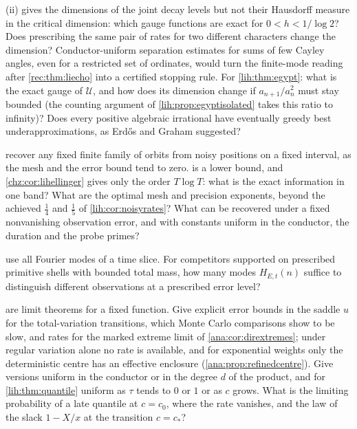 \begin{question}\label{li:q:decay}
(ii) gives the dimensions of the joint decay levels but not their Hausdorff measure in
the critical dimension: which gauge functions are exact for $0<h<1/\log2$? Does prescribing the same pair of
rates for two different characters change the dimension? Conductor-uniform separation estimates for
sums of few Cayley angles, even for a restricted set of ordinates, would turn the finite-mode reading
after \cref{rec:thm:liecho} into a certified stopping rule. For \cref{lih:thm:egypt}: what is the exact gauge
of $\mathcal U$, and how does its dimension change if $a_{n+1}/a_n^2$ must stay bounded (the counting argument
of \cref{lih:prop:egyptisolated} takes this ratio to infinity)? Does every positive algebraic irrational
have eventually greedy best underapproximations, as Erd\H{o}s and Graham suggested?
\end{question}

\begin{question}\label{li:q:paths}
 recover any fixed finite family of orbits from noisy positions
on a fixed interval, as the mesh and the error bound tend to zero.  is a lower
bound, and \cref{chz:cor:lihellinger} gives only the order $T\log T$: what is the exact information in one band? What are the optimal
mesh and precision exponents, beyond the achieved $\frac14$ and $\frac15$ of \cref{lih:cor:noisyrates}? What
can be recovered under a fixed nonvanishing observation error, and with constants uniform in the
conductor, the duration and the probe primes?
\end{question}

\begin{question}\label{li:q:modes}
 use all Fourier modes of a time slice. For competitors supported on
prescribed primitive shells with bounded total mass, how many modes $H_{E,t}(n)$ suffice to distinguish different
observations at a prescribed error level?
\end{question}

\begin{question}\label{ana:q:condlaw}
are limit theorems for a fixed function. Give explicit error bounds in the saddle $u$ for the
total-variation transitions, which Monte Carlo comparisons show to be slow, and rates for the marked
extreme limit of \cref{ana:cor:dirextremes}; under regular variation alone no rate is available, and for
exponential weights only the deterministic centre has an effective enclosure
(\cref{ana:prop:refinedcentre}). Give versions uniform in the conductor or in the degree $d$ of the
product, and for \cref{lih:thm:quantile} uniform as $\tau$ tends to $0$ or $1$ or as $c$ grows. What is the
limiting probability of a late quantile at $c=c_0$, where the rate vanishes, and the law of the slack
$1-X/x$ at the transition $c=c_*$?
\end{question}
